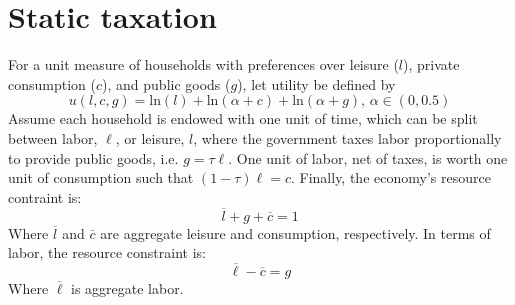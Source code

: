 \documentclass{article}
\newcommand{\loge}[1]{\text{ln}\left(#1\right)}
\begin{document}
\pagebreak
\section{Static taxation}
For a unit measure of households with preferences over leisure ($l$), private consumption ($c$), and public goods ($g$), let utility be defined by
\[
	u(l,c,g) = \loge{l} + \loge{\alpha + c} + \loge{\alpha + g}\text{, }\alpha\in(0,0.5) 
\]
Assume each household is endowed with one unit of time, which can be split between labor, $\ell$, or leisure, $l$, where the government taxes labor proportionally to provide public goods, i.e. $g=\tau\ell$. One unit of labor, net of taxes, is worth one unit of consumption such that $(1-\tau)\ell = c$. Finally, the economy's resource contraint is:
\[
	\overline{l} + g + \overline{c} = 1
\]
Where $\overline{l}$ and $\overline{c}$ are aggregate leisure and consumption, respectively. In terms of labor, the resource constraint is:
\[
	\overline{\ell} - \overline{c} = g
\]
Where $\overline{\ell}$ is aggregate labor.
\end{document}
